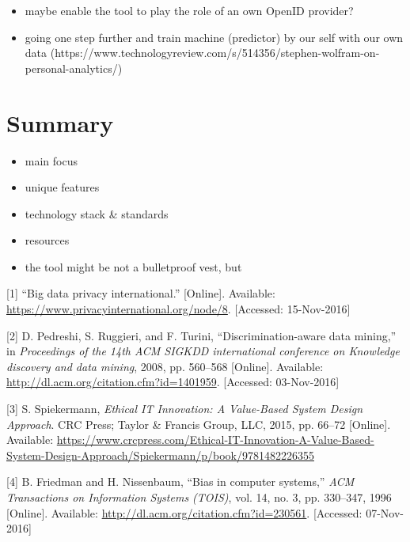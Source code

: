 \documentclass[12pt,english,a4paper,titlepage,cleardoublepage=empty,dottedtoc]{report}
\providecommand{\tightlist}{%
  \setlength{\itemsep}{0pt}\setlength{\parskip}{0pt}}
\begin{document}
\begin{itemize}
\tightlist
\item
  maybe enable the tool to play the role of an own OpenID provider?
\item
  going one step further and train machine (predictor) by our self with
  our own data
  (https://www.technologyreview.com/s/514356/stephen-wolfram-on-personal-analytics/)
\end{itemize}

\section{Summary}\label{summary}

\begin{itemize}
\tightlist
\item
  main focus
\item
  unique features
\item
  technology stack \& standards
\item
  resources
\item
  the tool might be not a bulletproof vest, but
\end{itemize}

\hypertarget{refs}{}
\hypertarget{ref-web_2016_privacy-international-about-big-data}{}
{[}1{]} ``Big data privacy international.'' {[}Online{]}. Available:
\url{https://www.privacyinternational.org/node/8}. {[}Accessed:
15-Nov-2016{]}

\hypertarget{ref-paper_2008_discrimination-aware-data-mining}{}
{[}2{]} D. Pedreshi, S. Ruggieri, and F. Turini, ``Discrimination-aware
data mining,'' in \emph{Proceedings of the 14th ACM SIGKDD international
conference on Knowledge discovery and data mining}, 2008, pp. 560--568
{[}Online{]}. Available:
\url{http://dl.acm.org/citation.cfm?id=1401959}. {[}Accessed:
03-Nov-2016{]}

\hypertarget{ref-book_2015_ethical-it-innovation_ethical-uses-of-information-and-knowledge}{}
{[}3{]} S. Spiekermann, \emph{Ethical IT Innovation: A Value-Based
System Design Approach}. CRC Press; Taylor \& Francis Group, LLC, 2015,
pp. 66--72 {[}Online{]}. Available:
\url{https://www.crcpress.com/Ethical-IT-Innovation-A-Value-Based-System-Design-Approach/Spiekermann/p/book/9781482226355}

\hypertarget{ref-paper_1996_bias-in-computer-systems}{}
{[}4{]} B. Friedman and H. Nissenbaum, ``Bias in computer systems,''
\emph{ACM Transactions on Information Systems (TOIS)}, vol. 14, no. 3,
pp. 330--347, 1996 {[}Online{]}. Available:
\url{http://dl.acm.org/citation.cfm?id=230561}. {[}Accessed:
07-Nov-2016{]}
\end{document}
